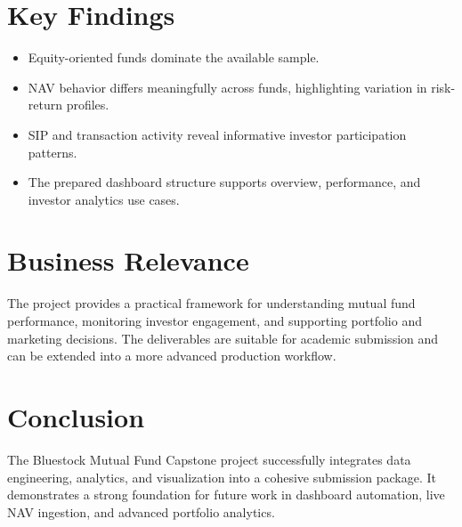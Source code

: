 \documentclass[11pt]{article}
\begin{document}
\section{Key Findings}
\begin{itemize}[leftmargin=1.5em]
\item Equity-oriented funds dominate the available sample.
\item NAV behavior differs meaningfully across funds, highlighting variation in risk-return profiles.
\item SIP and transaction activity reveal informative investor participation patterns.
\item The prepared dashboard structure supports overview, performance, and investor analytics use cases.
\end{itemize}

\section{Business Relevance}
The project provides a practical framework for understanding mutual fund performance, monitoring investor engagement, and supporting portfolio and marketing decisions. The deliverables are suitable for academic submission and can be extended into a more advanced production workflow.

\section{Conclusion}
The Bluestock Mutual Fund Capstone project successfully integrates data engineering, analytics, and visualization into a cohesive submission package. It demonstrates a strong foundation for future work in dashboard automation, live NAV ingestion, and advanced portfolio analytics.
\end{document}
